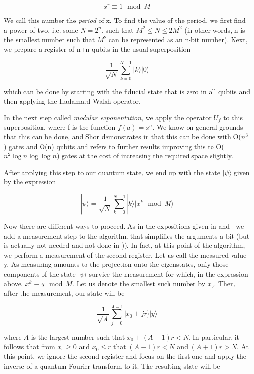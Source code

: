 \documentclass[a4paper, draft]{article}
\theoremstyle{own}
\theoremstyle{remark}
\begin{document}
$$
x^r \equiv 1 \mod M
$$

We call this number the \emph{period} of x. To find the value of the period, we first find a power of two, i.e. some $N = 2^n$, such that $M^2 \leq N \leq 2M^2$ (in other words, n is the smallest number such that $M^2$ can be represented as an n-bit number). Next, we prepare a register of n+n qubits in the usual superposition

$$
\frac{1}{\sqrt{N}} \sum_{k=0}^{N-1} |k \rangle  |0\rangle
$$

which can be done by starting with the fiducial state that is zero in all qubits and then applying the Hadamard-Walsh operator.

In the next step called \emph{modular exponentation}, we apply the operator $U_f$ to this superposition, where f is the function $f(a) = x^a$. We know on general grounds that this can be done, and Shor demonstrates in \cite{Shor96} that this can be done with O($n^3$) gates and O(n) qubits and refers to further results improving this to O($n^2 \log n \log \log n$) gates at the cost of increasing the required space slightly.  

After applying this step to our quantum state, we end up with the state $| \psi \rangle$ given by the expression

$$
|\psi \rangle = \frac{1}{\sqrt{N}} \sum_{k=0}^{N-1} |k \rangle  |x^k \mod M \rangle
$$

Now there are different ways to proceed. As in the expositions given in \cite{J} and \cite{P}, we add a measurement step to the algorithm that simplifies the arguments a bit (but is actually not needed and not done in \cite{Shor96})). In fact, at this point of the algorithm, we perform a measurement of the second register. Let us call the measured value y. As measuring amounts to the projection onto the eigenstates, only those components of the state $|\psi \rangle $ survice the measurement for which, in the expression above, $x^k \equiv y \mod M$. Let us denote the smallest such number by $x_0$. Then, after the measurement, our state will be

$$
\frac{1}{\sqrt{A}} \sum_{j=0}^{A-1} |x_0 + jr \rangle  |y \rangle
$$

where $A$ is the largest number such that $x_0 + (A-1)r < N$. In particular, it follows that from $x_0 \geq 0$ and $x_0 \leq r$ that  $(A-1)r < N$ and $(A+1)r > N$.  At this point, we ignore the second register and focus on the first one and apply the inverse of a quantum Fourier transform to it. The resulting state will be
\end{document}
